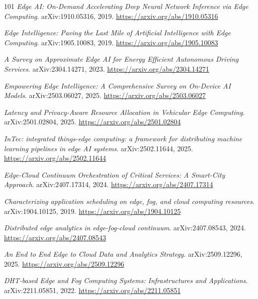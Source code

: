 \documentclass[11pt,a4paper]{article}
\begin{document}
\begin{thebibliography}{101}
\newblock \emph{Edge AI: On-Demand Accelerating Deep Neural Network Inference via Edge Computing}.
\newblock arXiv:1910.05316, 2019.
\newblock \url{https://arxiv.org/abs/1910.05316}

\newblock \emph{Edge Intelligence: Paving the Last Mile of Artificial Intelligence with Edge Computing}.
\newblock arXiv:1905.10083, 2019.
\newblock \url{https://arxiv.org/abs/1905.10083}

\newblock \emph{A Survey on Approximate Edge AI for Energy Efficient Autonomous Driving Services}.
\newblock arXiv:2304.14271, 2023.
\newblock \url{https://arxiv.org/abs/2304.14271}

\newblock \emph{Empowering Edge Intelligence: A Comprehensive Survey on On-Device AI Models}.
\newblock arXiv:2503.06027, 2025.
\newblock \url{https://arxiv.org/abs/2503.06027}

\newblock \emph{Latency and Privacy-Aware Resource Allocation in Vehicular Edge Computing}.
\newblock arXiv:2501.02804, 2025.
\newblock \url{https://arxiv.org/abs/2501.02804}

\newblock \emph{InTec: integrated things-edge computing: a framework for distributing machine learning pipelines in edge AI systems}.
\newblock arXiv:2502.11644, 2025.
\newblock \url{https://arxiv.org/abs/2502.11644}

\newblock \emph{Edge-Cloud Continuum Orchestration of Critical Services: A Smart-City Approach}.
\newblock arXiv:2407.17314, 2024.
\newblock \url{https://arxiv.org/abs/2407.17314}

\newblock \emph{Characterizing application scheduling on edge, fog, and cloud computing resources}.
\newblock arXiv:1904.10125, 2019.
\newblock \url{https://arxiv.org/abs/1904.10125}

\newblock \emph{Distributed edge analytics in edge-fog-cloud continuum}.
\newblock arXiv:2407.08543, 2024.
\newblock \url{https://arxiv.org/abs/2407.08543}

\newblock \emph{An End to End Edge to Cloud Data and Analytics Strategy}.
\newblock arXiv:2509.12296, 2025.
\newblock \url{https://arxiv.org/abs/2509.12296}

\newblock \emph{DHT-based Edge and Fog Computing Systems: Infrastructures and Applications}.
\newblock arXiv:2211.05851, 2022.
\newblock \url{https://arxiv.org/abs/2211.05851}


\end{thebibliography}
\end{document}
